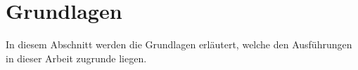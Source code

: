 \chapter{Grundlagen}
\label{ch_03Grund}
In diesem Abschnitt werden die Grundlagen erläutert, welche den Ausführungen in dieser Arbeit zugrunde liegen. 



